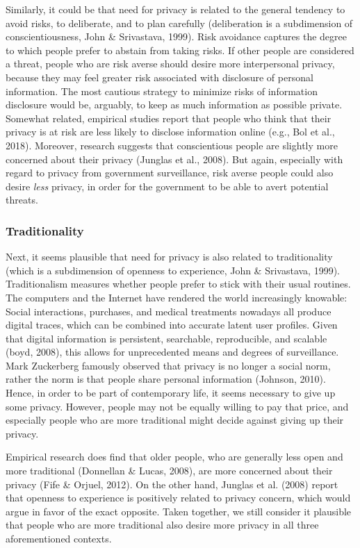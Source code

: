 \documentclass[man,floatsintext]{apa6}
\begin{document}
Similarly, it could be that need for privacy is related to the general tendency to avoid risks, to deliberate, and to plan carefully (deliberation is a subdimension of conscientiousness, John \& Srivastava, 1999). Risk avoidance captures the degree to which people prefer to abstain from taking risks. If other people are considered a threat, people who are risk averse should desire more interpersonal privacy, because they may feel greater risk associated with disclosure of personal information. The most cautious strategy to minimize risks of information disclosure would be, arguably, to keep as much information as possible private. Somewhat related, empirical studies report that people who think that their privacy is at risk are less likely to disclose information online (e.g., Bol et al., 2018). Moreover, research suggests that conscientious people are slightly more concerned about their privacy (Junglas et al., 2008). But again, especially with regard to privacy from government surveillance, risk averse people could also desire \emph{less} privacy, in order for the government to be able to avert potential threats.

\hypertarget{traditionality}{%
\subsubsection{Traditionality}\label{traditionality}}

Next, it seems plausible that need for privacy is also related to traditionality (which is a subdimension of openness to experience, John \& Srivastava, 1999). Traditionalism measures whether people prefer to stick with their usual routines. The computers and the Internet have rendered the world increasingly knowable: Social interactions, purchases, and medical treatments nowadays all produce digital traces, which can be combined into accurate latent user profiles. Given that digital information is persistent, searchable, reproducible, and scalable (boyd, 2008), this allows for unprecedented means and degrees of surveillance. Mark Zuckerberg famously observed that privacy is no longer a social norm, rather the norm is that people share personal information (Johnson, 2010). Hence, in order to be part of contemporary life, it seems necessary to give up some privacy. However, people may not be equally willing to pay that price, and especially people who are more traditional might decide against giving up their privacy.

Empirical research does find that older people, who are generally less open and more traditional (Donnellan \& Lucas, 2008), are more concerned about their privacy (Fife \& Orjuel, 2012). On the other hand, Junglas et al. (2008) report that openness to experience is positively related to privacy concern, which would argue in favor of the exact opposite. Taken together, we still consider it plausible that people who are more traditional also desire more privacy in all three aforementioned contexts.
\end{document}
